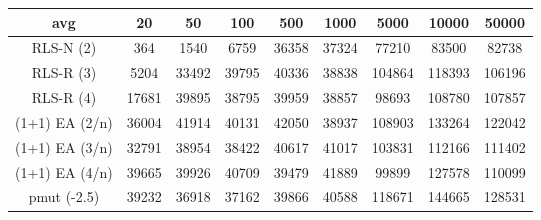 \begin{tabular}[h]{ccccccccc}
avg&20&50&100&500&1000&5000&10000&50000\\\hline
RLS-N (2)&364&1540&6759&36358&37324&77210&83500&82738\\
RLS-R (3)&5204&33492&39795&40336&38838&104864&118393&106196\\
RLS-R (4)&17681&39895&38795&39959&38857&98693&108780&107857\\
(1+1) EA (2/n)&36004&41914&40131&42050&38937&108903&133264&122042\\
(1+1) EA (3/n)&32791&38954&38422&40617&41017&103831&112166&111402\\
(1+1) EA (4/n)&39665&39926&40709&39479&41889&99899&127578&110099\\
pmut (-2.5)&39232&36918&37162&39866&40588&118671&144665&128531\\
\end{tabular}
